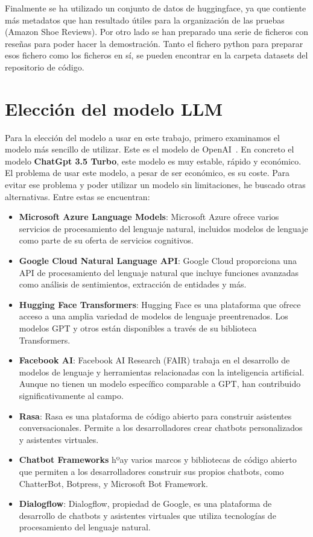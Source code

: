 Finalmente se ha utilizado un conjunto de datos de huggingface, ya que contiente más metadatos que han resultado útiles
para la organización de las pruebas (Amazon Shoe Reviews).
Por otro lado se han preparado una serie de ficheros con reseñas para poder hacer la demostración.
Tanto el fichero python para preparar esos fichero como los ficheros en sí, se pueden encontrar en la 
carpeta datasets del repositorio de código.

\section{Elección del modelo LLM}

Para la elección del modelo a usar en este trabajo, primero examinamos el modelo más sencillo de utilizar.
Este es el modelo de OpenAI~\cite{chatgpt1}. En concreto el modelo \textbf{ChatGpt 3.5 Turbo}, este modelo es muy estable, rápido y económico.
El problema de usar este modelo, a pesar de ser económico, es su coste.
Para evitar ese problema y poder utilizar un modelo sin limitaciones, he buscado otras alternativas.
Entre estas se encuentran:
\begin{itemize}
   \item \textbf{Microsoft Azure Language Models}: Microsoft Azure ofrece varios servicios de procesamiento del lenguaje natural, incluidos modelos de lenguaje como parte de su oferta de servicios cognitivos.
   \item \textbf{Google Cloud Natural Language API}: Google Cloud proporciona una API de procesamiento del lenguaje natural que incluye funciones avanzadas como análisis de sentimientos, extracción de entidades y más.
   \item \textbf{Hugging Face Transformers}: Hugging Face es una plataforma que ofrece acceso a una amplia variedad de modelos de lenguaje preentrenados. Los modelos GPT y otros están disponibles a través de su biblioteca Transformers.
   \item \textbf{Facebook AI}: Facebook AI Research (FAIR) trabaja en el desarrollo de modelos de lenguaje y herramientas relacionadas con la inteligencia artificial. Aunque no tienen un modelo específico comparable a GPT, han contribuido significativamente al campo.
   \item \textbf{Rasa}: Rasa es una plataforma de código abierto para construir asistentes conversacionales. Permite a los desarrolladores crear chatbots personalizados y asistentes virtuales.
   \item \textbf{Chatbot Frameworks} hºay varios marcos y bibliotecas de código abierto que permiten a los desarrolladores construir sus propios chatbots, como ChatterBot, Botpress, y Microsoft Bot Framework.
   \item \textbf{Dialogflow}: Dialogflow, propiedad de Google, es una plataforma de desarrollo de chatbots y asistentes virtuales que utiliza tecnologías de procesamiento del lenguaje natural.
\end{itemize}

